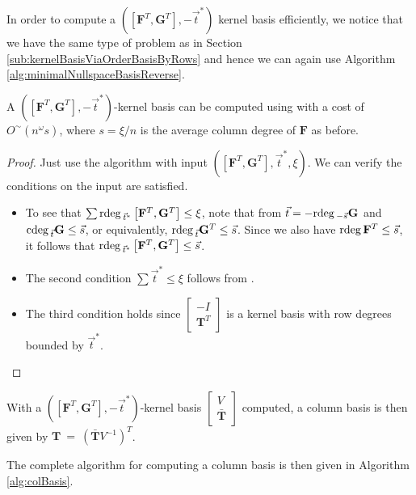 In order to compute a $\left(\left[\mathbf{F}^{T},\mathbf{G}^{T}\right],-\vec{t}^{*}\right)$
kernel basis efficiently, we notice that we have the same type of
problem as in Section \ref{sub:kernelBasisViaOrderBasisByRows} and
hence we can again use Algorithm \ref{alg:minimalNullspaceBasisReverse}. 
\begin{lem}
\label{lem:costOfKernelBasisReversedForLeftFactor}A $\left(\left[\mathbf{F}^{T},\mathbf{G}^{T}\right],-\vec{t}^{*}\right)$-kernel
basis can be computed using 
with a cost of $O^{\sim}\left(n^{\omega}s\right)$, where $s=\xi/n$
is the average column degree of $\mathbf{F}$ as before. \end{lem}
\begin{proof}
Just use the algorithm with input $\left(\left[\mathbf{F}^{T},\mathbf{G}^{T}\right],\vec{t}^{*},\xi\right)$.
We can verify the conditions on the input are satisfied.
\begin{itemize}
\item To see that $\sum{\rm rdeg}\,_{\vec{t}^{*}}\left[\mathbf{F}^{T},\mathbf{G}^{T}\right]\le\xi$,
note that from $\vec{t}=-{\rm rdeg}\,_{-\vec{s}}\mathbf{G}$ and 
${\rm cdeg}\,_{\vec{t}}\mathbf{G}\le\vec{s}$, or equivalently, ${\rm rdeg}\,_{\vec{t}}\mathbf{G}^{T}\le\vec{s}$.
Since we also have ${\rm rdeg}\,\mathbf{F}^{T}\le\vec{s}$, it follows that
${\rm rdeg}\,_{\vec{t}^{*}}\left[\mathbf{F}^{T},\mathbf{G}^{T}\right]\le\vec{s}$. 
\item The second condition $\sum\vec{t}^{*}\le\xi$ follows from .
\item The third condition holds since $\begin{bmatrix}-I\\
\mathbf{T}^{T}
\end{bmatrix}$ is a kernel basis with row degrees bounded by $\vec{t}^{*}$.
\end{itemize}
\end{proof}
With a $\left(\left[\mathbf{F}^{T},\mathbf{G}^{T}\right],-\vec{t}^{*}\right)$-kernel
basis $\begin{bmatrix}V\\
\bar{\mathbf{T}}
\end{bmatrix}$ computed, a column basis is then given by $\mathbf{T}~=~\left(\bar{\mathbf{T}}V^{-1}\right)^{T}$.

The complete algorithm for computing a column basis is then given
in Algorithm \ref{alg:colBasis}.

